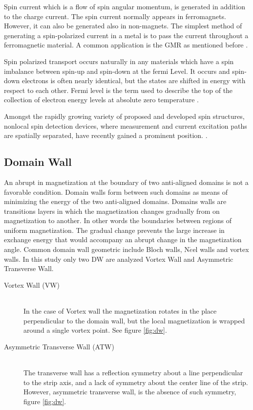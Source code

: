  Spin current which is a flow of spin angular momentum, is generated in addition to the charge current. The spin current normally appears in ferromagnets. However, it can also be generated also in non-magnets. The simplest method of generating a spin-polarized current in a metal is to pass the current throughout a ferromagnetic material. A common application is the GMR as mentioned before \cite{handbookspin}.
 
Spin polarized transport occurs naturally in any materials which have a spin imbalance between spin-up and spin-down at the fermi Level. It occurs and spin-down electrons is often nearly identical, but the states are shifted in energy with respect to each other. Fermi level is the term used to describe the top of the collection of electron energy levels at absolute zero temperature \cite{handbookspin}.


Amongst the rapidly growing variety of proposed and developed spin structures, nonlocal spin detection devices, where measurement and current excitation paths are spatially separated, have recently gained a prominent position. \cite{nonlocalspin}.

\subsection{Domain Wall}

An abrupt in magnetization at the boundary of two anti-aligned domains is not a favorable condition. Domain walls form between such domains as means of minimizing the energy of the two anti-aligned domains. Domains walls are transitions layers in which the magnetization changes gradually from on magnetization to another. In other words the boundaries between regions of uniform magnetization.  The gradual change prevents the large increase in exchange energy that would accompany an abrupt change in the magnetization angle. Common domain wall geometric include Bloch walls, N$\acute{e}$el walls and vortex walls\cite{spindomain}. In this study only two DW are analyzed Vortex Wall and Asymmetric Transverse Wall.

\begin{description}
  \item[Vortex Wall (VW)] \hfill \\
   In the case of Vortex wall the magnetization rotates in the place perpendicular to the domain wall, but the local magnetization is wrapped around a single vortex point. See figure \ref{fig:dw}.
   
 \item[Asymmetric Transverse Wall (ATW)] \hfill \\
 The transverse wall has a reflection symmetry about a line perpendicular to the strip axis, and a lack of symmetry about the center line of the strip. However, asymmetric transverse wall, is the absence of such symmetry, figure \ref{fig:dw}.
 
\end{description}

